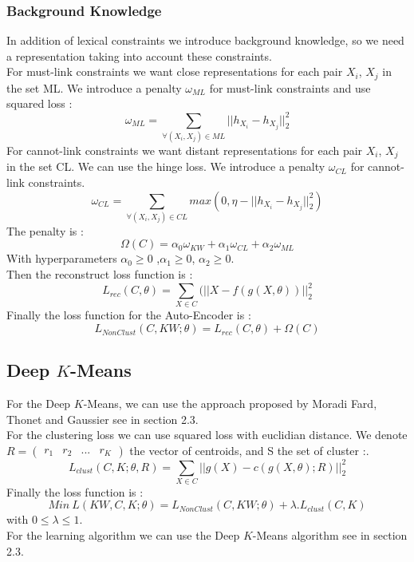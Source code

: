 \subsubsection{Background Knowledge}
In addition of lexical constraints we introduce background knowledge, so we need
a representation taking into account these constraints.\\
For must-link constraints we want close representations for each pair $X_i$, $X_j$
in the set ML. We introduce a penalty $\omega_{ML}$ for must-link
constraints and use squared loss :
\begin{equation}\label{eq:omegaML}
  \omega_{ML} = \sum_{\forall{(X_i,X_j)\in ML}} || h_{X_i} - h_{X_j} ||_2^2
\end{equation}
For cannot-link constraints we want distant representations for each pair $X_i$,
$X_j$ in the set CL.
We can use the hinge loss.
We introduce a penalty $\omega_{CL}$ for cannot-link constraints.
\begin{equation}\label{eq:omegaCL}
  \omega_{CL} = \sum_{\forall{(X_i,X_j)\in CL}} max(0,
  \eta - || h_{X_i} - h_{X_j} ||_2^2)
\end{equation}
The penalty is :
\begin{equation}\label{eq:Sparse}
  \Omega(C) = \alpha_0\omega_{KW} + \alpha_1\omega_{CL} + \alpha_2\omega_{ML}  
\end{equation}
With hyperparameters $\alpha_0\geq 0$ ,$\alpha_1\geq 0$, $\alpha_2\geq 0$.
\\Then the reconstruct loss function is :
\begin{equation}\label{eq:AEDK}
  L_{rec}(C, \theta) = \sum_{X \in C}(||X - f(g(X, \theta))||_2^2
\end{equation}
Finally the loss function for the Auto-Encoder is :
\begin{equation}\label{eq:AE}
  L_{NonClust}(C,KW; \theta) = L_{rec}(C, \theta) + \Omega(C)  
\end{equation}

\subsection{Deep $K$-Means}

For the Deep $K$-Means, we can use the approach proposed by Moradi Fard, Thonet and Gaussier 
\cite{Deap-K-Means} see in section 2.3.\\
For the clustering loss we can use squared loss with euclidian distance. We
denote $R = \begin{pmatrix} r_1 & r_2 & ... & r_K\end{pmatrix}$ the vector of
centroids, and S the set of cluster :.  
\begin{equation}\label{eq:loss_clust}
  L_{clust}(C, K; \theta, R) = \sum_{X \in C} ||g(X) - c(g(X, \theta); R) ||_2^2 
\end{equation}
Finally the loss function is :
\begin{equation}\label{eq:loss_FINALE}
  Min~L(KW, C, K; \theta) = L_{NonClust}(C, KW; \theta) + \lambda.L_{clust}(C,K)
\end{equation}
with $0 \leq \lambda \leq 1$.\\
For the learning algorithm we can use the Deep $K$-Means algorithm see
in section 2.3.